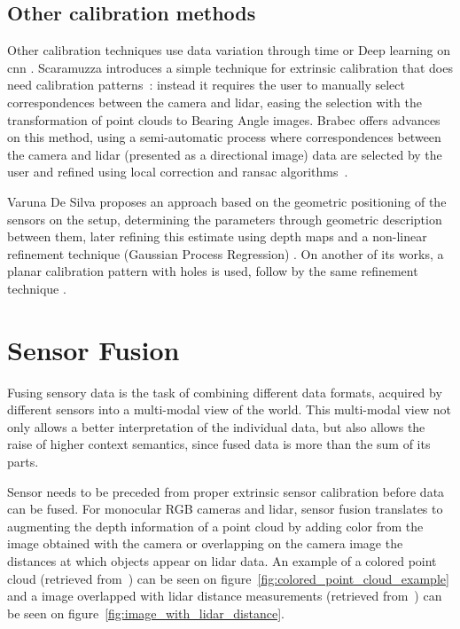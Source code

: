 \subsection{Other calibration methods}
Other calibration techniques use data variation through time \cite{Chien2017} or Deep learning on \ac{cnn} \cite{Wang2018a}. Scaramuzza \etal introduces a simple technique for extrinsic calibration that does need calibration patterns~\cite{Scaramuzza}: instead it requires the user to manually select correspondences between the camera and \ac{lidar}, easing the selection with the transformation of point clouds to Bearing Angle images. Brabec offers advances on this method, using a semi-automatic process where correspondences between the camera and \ac{lidar} (presented as a directional image) data are selected by the user and refined using local correction and \ac{ransac} algorithms~\cite{brabec2014}.


Varuna De Silva \etal proposes an approach based on the geometric positioning of the sensors on the setup, determining the parameters through geometric description between them, later refining this estimate using depth maps and a non-linear refinement technique (Gaussian Process Regression) \cite{DeSilva2018}. On another of its works, a planar calibration pattern with holes is used, follow by the same refinement technique \cite{Silva2018}.


\section{Sensor Fusion}
\label{sec:sota:sensor-fusion}
Fusing sensory data is the task of combining different data formats, acquired by different sensors into a multi-modal view of the world. This multi-modal view not only allows a better interpretation of the individual data, but also allows the raise of higher context semantics, since fused data is more than the sum of its parts.

Sensor needs to be preceded from proper extrinsic sensor calibration before data can be fused. For monocular RGB cameras and \ac{lidar}, sensor fusion translates to augmenting the depth information of a point cloud by adding color from the image obtained with the camera or overlapping on the camera image the distances at which objects appear on \ac{lidar} data. An example of a colored point cloud (retrieved from~\cite{Gong2013}) can be seen on figure~\ref{fig:colored_point_cloud_example} and a image overlapped with \ac{lidar} distance measurements (retrieved from~\cite{Bileschi2009}) can be seen on figure~\ref{fig:image_with_lidar_distance}.

